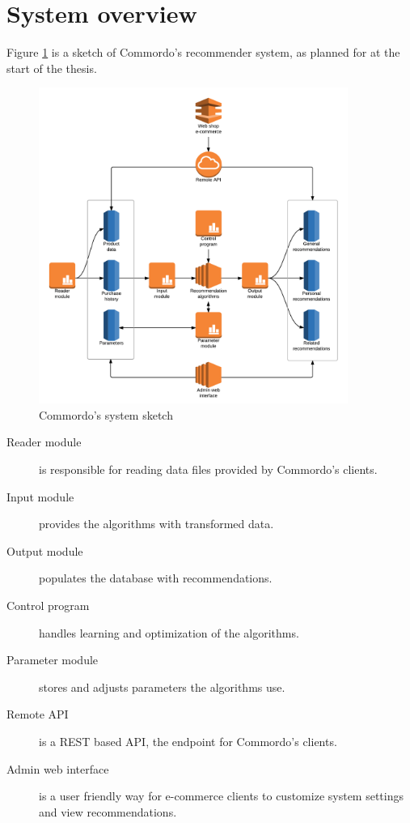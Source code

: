 \section{System overview}\label{sec:sysoverview}

Figure \ref{fig:sysoverview} is a sketch of Commordo's recommender system, as planned for at the start of the thesis.

\begin{figure}[h!]
  \centering
    \includegraphics[width=0.9\textwidth]{fig/system_overview.png}
  \caption{Commordo's system sketch}
  \label{fig:sysoverview}
\end{figure}

\FloatBarrier

\begin{description}
    \item[Reader module] is responsible for reading data files provided by Commordo's clients.
    \item[Input module] provides the algorithms with transformed data.
    \item[Output module] populates the database with recommendations.
    \item[Control program] handles learning and optimization of the algorithms.
    \item[Parameter module] stores and adjusts parameters the algorithms use.
    \item[Remote API] is a REST based API, the endpoint for Commordo's clients.
    \item[Admin web interface] is a user friendly way for e-commerce clients to customize system settings and view recommendations.
\end{description}

